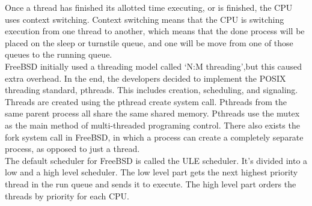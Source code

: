 \documentclass[titlepage]{article}
\begin{document}
\begin{singlespace}
Once a thread has finished its allotted time executing, or is finished, the CPU uses context switching. Context switching means that the CPU is switching execution from one thread to another, which means that the done process will be placed on the sleep or turnstile queue, and one will be move from one of those queues to the running queue.\\
    FreeBSD initially used a threading model called ‘N:M threading’,but this caused extra overhead. In the end, the developers decided to implement the POSIX threading standard, pthreads. This includes creation, scheduling, and signaling. Threads are created using the pthread create system call. Pthreads from the same parent process all share the same shared memory. Pthreads use the mutex as the main method of multi-threaded programing control. There also exists the fork system call in FreeBSD, in which a process can create a completely separate process, as opposed to just a thread. \\
    The default scheduler for FreeBSD is called the ULE scheduler. It’s divided into a low and a high level scheduler. The low level part gets the next highest priority thread in the run queue and sends it to execute. The high level part orders the threads by priority for each CPU. \cite{freebsdch4}\\


\end{singlespace}
\end{document}

